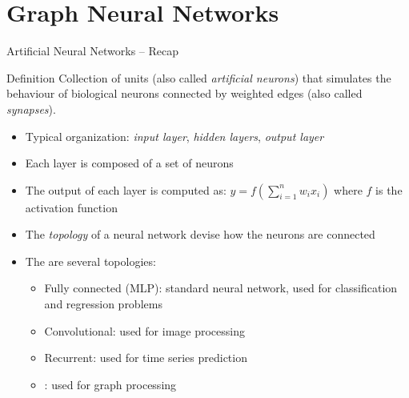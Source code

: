 \documentclass[presentation, 9pt]{beamer}\mode<presentation>{\usetheme{AMSBolognaFC}}
\begin{document}
\section{Graph Neural Networks}
\begin{frame}{Artificial Neural Networks -- Recap}
\begin{alertblock}{Definition}
	Collection of units (also called \emph{artificial neurons}) that simulates the behaviour of biological neurons
	connected by weighted edges (also called \emph{synapses}).
\end{alertblock}
\begin{itemize}
	\item Typical organization: \emph{input layer}, \emph{hidden layers}, \emph{output layer}
	\item Each layer is composed of a set of neurons
	\item The output of each layer is computed as: $y = f(\sum_{i=1}^n w_i x_i)$ where $f$ is the activation function
	\item The \emph{topology} of a neural network devise how the neurons are connected
	\item The are several topologies:
	\begin{itemize}
		\item Fully connected (MLP): standard neural network, used for classification and regression problems 
		\item Convolutional: used for image processing
		\item Recurrent: used for time series prediction
		\item {}: used for graph processing
	\end{itemize}
\end{itemize}
\end{frame}
\end{document}
